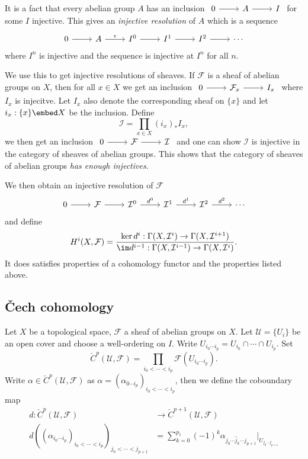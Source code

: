 \documentclass[a4paper]{article}
\newcommand{\sh}[1]{\mathcal{#1}} %
\begin{document}
It is a fact that every abelian group \(A\) has an inclusion \(
\begin{tikzcd}
  0 \ar[r] & A \ar[r] & I
\end{tikzcd}
\) for some \(I\) injective. This gives an \emph{injective resolution} of \(A\) which is a sequence
\[
  \begin{tikzcd}
    0 \ar[r] & A \ar[r, "\epsilon"] & I^0 \ar[r] & I^1 \ar[r] & I^2 \ar[r] & \cdots
  \end{tikzcd}
\]
where \(I^n\) is injective and the sequence is injective at \(I^n\) for all \(n\).

We use this to get injective resolutions of sheaves. If \(\sh F\) is a sheaf of abelian groups on \(X\), then for all \(x \in X\) we get an inclusion \(
\begin{tikzcd}
  0 \ar[r] & \sh F_x \ar[r] & I_x
\end{tikzcd}
\) where \(I_x\) is injecitve. Let \(I_x\) also denote the corresponding sheaf on \(\{x\}\) and let \(i_x: \{x\} \embed X\) be the inclusion. Define
\[
  \sh I = \prod_{x \in X} (i_x)_* I_x,
\]
we then get an inclusion \(
\begin{tikzcd}
  0 \ar[r] & \sh F \ar[r] & \sh I
\end{tikzcd}
\) and one can show \(\sh I\) is injective in the category of sheaves of abelian groups. This shows that the category of sheaves of abelian groups \emph{has enough injectives}.

We then obtain an injective resolution of \(\sh F\)
\[
  \begin{tikzcd}
    0 \ar[r] & \sh F \ar[r] & \sh I^0 \ar[r, "d^0"] & \sh I^1 \ar[r, "d^1"] & \sh I^2 \ar[r, "d^2"] & \cdots
  \end{tikzcd}
\]
and define
\[
  H^i(X, \sh F) = \frac{\ker d^i: \Gamma(X, \sh I^i) \to \Gamma(X, \sh I^{i + 1})}{\im d^{i - 1}: \Gamma(X, \sh I^{i - 1}) \to \Gamma(X, \sh I^i)}.
\]
It does satisfies properties of a cohomology functor and the properties listed above.

\subsection{Čech cohomology}

Let \(X\) be a topological space, \(\sh F\) a sheaf of abelian groups on \(X\). Let \(\mathcal U = \{U_i\}\) be an open cover and choose a well-ordering on \(I\). Write \(U_{i_0 \cdots i_p} = U_{i_0} \cap \cdots \cap U_{i_p}\). Set
\[
  \check C^p(\mathcal U, \sh F) = \prod_{i_0 < \cdots < i_p} \sh F(U_{i_0 \cdots i_p}).
\]
Write \(\alpha \in \check C^p(\mathcal U, \sh F)\) as \(\alpha = (\alpha_{0 \cdots i_p})_{i_0 < \cdots < i_p}\), then we define the coboundary map
\begin{align*}
  d: \check C^p(\mathcal U, \sh F) &\to \check C^{p + 1}(\mathcal U, \sh F) \\
  d((\alpha_{i_0 \cdots i_p})_{i_0 < \cdots < i_p})_{j_0 < \cdots < j_{p + 1}} &= \sum_{k = 0}^{p _ 1} (-1)^k \alpha_{j_0 \cdots \hat j_k \cdots j_{p + 1}}|_{U_{j_0 \cdots j_{p + 1}}}
\end{align*}
\end{document}
